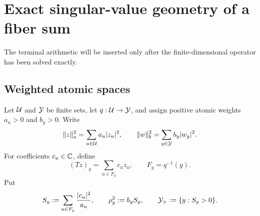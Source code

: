 \section{Exact singular-value geometry of a fiber sum}
\label{sec:fiber-svd}

The terminal arithmetic will be inserted only after the finite-dimensional
operator has been solved exactly.

\subsection{Weighted atomic spaces}

Let \(\mathcal U\) and \(\mathcal Y\) be finite sets, let
\(q:\mathcal U\to\mathcal Y\), and assign positive atomic weights \(a_u>0\) and
\(b_y>0\).  Write
\begin{equation}
 \|z\|_a^2=\sum_{u\in\mathcal U}a_u|z_u|^2,
 \qquad
 \|w\|_b^2=\sum_{y\in\mathcal Y}b_y|w_y|^2.
 \label{eq:tpc55-weighted-norms}
\end{equation}
For coefficients \(c_u\in\mathbb C\), define
\begin{equation}
 (Tz)_y=\sum_{u\in F_y}c_uz_u,
 \qquad F_y=q^{-1}(y).
 \label{eq:tpc55-general-fiber-operator}
\end{equation}
Put
\begin{equation}
 S_y:=\sum_{u\in F_y}\frac{|c_u|^2}{a_u},
 \qquad
 \rho_y^2:=b_yS_y,
 \qquad
 \mathcal Y_+:=\{y:S_y>0\}.
 \label{eq:tpc55-fiber-row-norm}
\end{equation}

